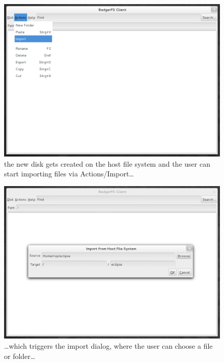 \begin{figure}[h!]
\centering
\includegraphics[width=1\textwidth]{figures/03_quickstart.png}
\caption{the new disk gets created on the host file system and the user can
start importing files via Actions/Import\ldots}
\label{fig:03_quickstart}
\end{figure}

\begin{figure}[h!]
\centering
\includegraphics[width=1\textwidth]{figures/04_quickstart.png}
\caption{\ldots which triggers the import dialog, where the user can choose a
file or folder\ldots}
\label{fig:04_quickstart}
\end{figure}

